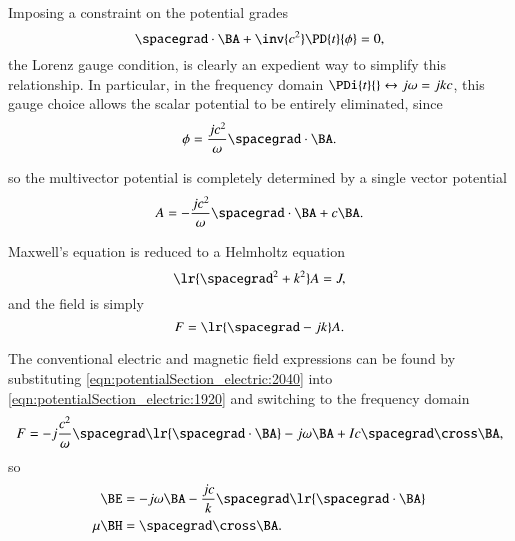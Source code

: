 Imposing a constraint on the potential grades
\begin{dmath}\label{eqn:potentialSection_electric:2020}
\spacegrad \cdot \BA + \inv{c^2} \PD{t}{\phi} = 0,
\end{dmath}
the Lorenz gauge condition, is clearly an expedient way to simplify this relationship.
In particular,
in the frequency domain \( \PDi{t}{} \leftrightarrow j \omega = j k c \), this gauge choice allows the scalar potential to be entirely eliminated, since
\begin{dmath}\label{eqn:potentialSection_electric:2040}
\phi = \frac{j c^2}{\omega} \spacegrad \cdot \BA.
\end{dmath}

so the multivector potential is completely determined by a single vector potential
\begin{dmath}\label{eqn:potentialSection_electric:2060}
A =
-\frac{j c^2}{\omega} \spacegrad \cdot \BA + c \BA.
\end{dmath}

Maxwell's equation is reduced to a Helmholtz equation
\begin{dmath}\label{eqn:potentialSection_electric:2080}
\lr{ \spacegrad^2 + k^2} A = J,
\end{dmath}
and the field is simply
\begin{dmath}\label{eqn:potentialSection_electric:2100}
F = \lr{ \spacegrad - j k } A.
\end{dmath}

The conventional electric and magnetic field expressions can be found by substituting \cref{eqn:potentialSection_electric:2040} into
\cref{eqn:potentialSection_electric:1920} and switching to the frequency domain
\begin{dmath}\label{eqn:potentialSection_electric:2380}
F
=
-j \frac{c^2}{\omega} \spacegrad \lr{ \spacegrad \cdot \BA }
-j \omega \BA
+ I c \spacegrad \cross \BA,
\end{dmath}
%
%
so
\begin{dmath}\label{eqn:potentialSection_electric:2320}
\begin{aligned}
\BE &= -j \omega \BA -\frac{j c}{k} \spacegrad \lr{ \spacegrad \cdot \BA } \\
\mu \BH &= \spacegrad \cross \BA.
\end{aligned}
\end{dmath}
